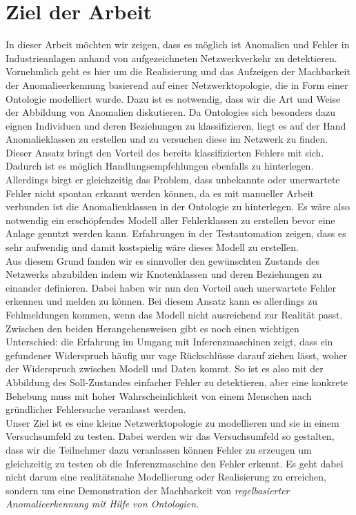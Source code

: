 \chapter{Ziel der Arbeit}
In dieser Arbeit möchten wir zeigen, dass es möglich ist Anomalien und Fehler in Industrieanlagen anhand von aufgezeichneten Netzwerkverkehr zu detektieren. Vornehmlich geht es hier um die Realisierung und das Aufzeigen der Machbarkeit der Anomalieerkennung basierend auf einer Netzwerktopologie, die in Form einer Ontologie modelliert wurde. Dazu ist es notwendig, dass wir die Art und Weise der Abbildung von Anomalien diskutieren. Da \Glspl{Ontologie} sich besonders dazu eignen Individuen und deren Beziehungen zu klassifizieren, liegt es auf der Hand Anomalieklassen zu erstellen und zu versuchen diese im Netzwerk zu finden. Dieser Ansatz bringt den Vorteil des bereits klassifizierten Fehlers mit sich. Dadurch ist es möglich Handlungsempfehlungen ebenfalls zu hinterlegen. Allerdings birgt er gleichzeitig das Problem, dass unbekannte oder unerwartete Fehler nicht spontan erkannt werden können, da es mit manueller Arbeit verbunden ist die Anomalienklassen in der \Gls{Ontologie} zu hinterlegen. Es wäre also notwendig ein erschöpfendes Modell aller Fehlerklassen zu erstellen bevor eine Anlage genutzt werden kann. Erfahrungen in der Testautomation zeigen, dass es sehr aufwendig und damit kostspielig wäre dieses Modell zu erstellen.\\
Aus diesem Grund fanden wir es sinnvoller den gewünschten Zustands des Netzwerks abzubilden indem wir Knotenklassen und deren Beziehungen zu einander definieren. Dabei haben wir nun den Vorteil auch unerwartete Fehler erkennen und melden zu können. Bei diesem Ansatz kann es allerdings zu Fehlmeldungen kommen, wenn das Modell nicht ausreichend zur Realität passt. Zwischen den beiden Herangehensweisen gibt es noch einen wichtigen Unterschied: die Erfahrung im Umgang mit Inferenzmaschinen zeigt, dass ein gefundener Widerspruch häufig nur vage Rückschlüsse darauf ziehen lässt, woher der Widerspruch zwischen Modell und Daten kommt. So ist es also mit der Abbildung des Soll-Zustandes einfacher Fehler zu detektieren, aber eine konkrete Behebung muss mit hoher Wahrscheinlichkeit von einem Menschen nach gründlicher Fehlersuche veranlasst werden.\\
Unser Ziel ist es eine kleine Netzwerktopologie zu modellieren und sie in einem Versuchsumfeld zu testen. Dabei werden wir das Versuchsumfeld so gestalten, dass wir die Teilnehmer dazu veranlassen können Fehler zu erzeugen um gleichzeitig zu testen ob die Inferenzmaschine den Fehler erkennt. Es geht dabei nicht darum eine realitätsnahe Modellierung oder Realisierung zu erreichen, sondern um eine Demonstration der Machbarkeit von \textit{regelbasierter Anomalieerkennung mit Hilfe von Ontologien}.

